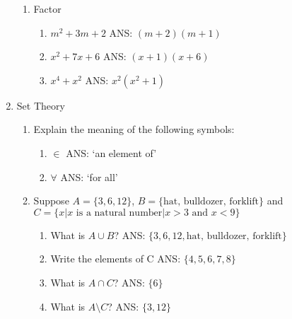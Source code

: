 \documentclass[11pt]{article}
\begin{document}
\begin{enumerate}
\begin{enumerate}
\item Factor
\begin{enumerate}
\item $m^2+3m+2 $ \color{gray} ANS: $(m+2)(m+1)$\color{black} \\
\item $x^2+7x+6$ \color{gray} ANS: $(x+1)(x+6)$ \color{black} \\
\item $x^4+x^2$ \color{gray} ANS: $x^2(x^2+1) $ \color{black} \\
\end{enumerate}

\end{enumerate}

\item Set Theory
\begin{enumerate}
\item Explain the meaning of the following symbols:
\begin{enumerate}
\item $\in$ \color{gray} ANS: `an element of' \color{black} \\
\item $\forall$ \color{gray} ANS: `for all'  \color{black} \\
\end{enumerate}
\item Suppose $A=\{3, 6, 12\}$,  $B=\{\text{hat, bulldozer, forklift}\}$ and $C=\{x| x\text{ is a natural number}| x >3 \text{ and } x<9\}$
\begin{enumerate}
\item What is $A \cup B$? \color{gray} ANS: $\{ 3, 6, 12,  \text{hat, bulldozer, forklift}\}$\color{black} \\
\item Write the elements of C \color{gray} ANS: $\{ 4,5,6,7,8\} $ \color{black} \\
\item What is $A \cap C$? \color{gray} ANS: $\{6\}$ \color{black} \\
\item What is $A\setminus C$? \color{gray} ANS: $\{3,12\}$ \color{black} \\
\end{enumerate}
\end{enumerate}




\end{enumerate}
\end{document}
